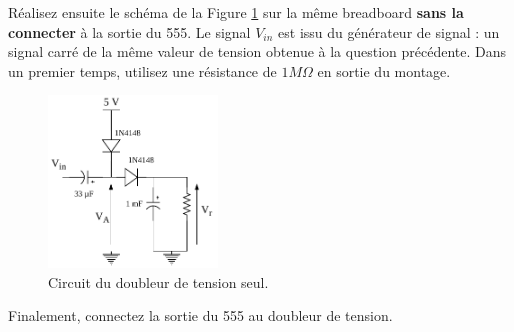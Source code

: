 \documentclass{../template/labo}
\begin{document}
Réalisez ensuite le schéma de la Figure \ref{Doubleur2} sur la même breadboard \textbf{sans la connecter} à la sortie du 555. Le signal $V_{in}$ est issu du générateur de signal : un signal carré de la même valeur de tension obtenue à la question précédente.
Dans un premier temps, utilisez une résistance de $1 M\Omega$ en sortie du montage.




\begin{figure}[ht]
\centering
\includegraphics[width=0.4\textwidth]{doubler.pdf}
\caption{Circuit du doubleur de tension seul.}
\label{Doubleur2}
\end{figure}

{

}

{

}


Finalement, connectez la sortie du 555 au doubleur de tension.


{

}


{

}


{

}




\end{document}
